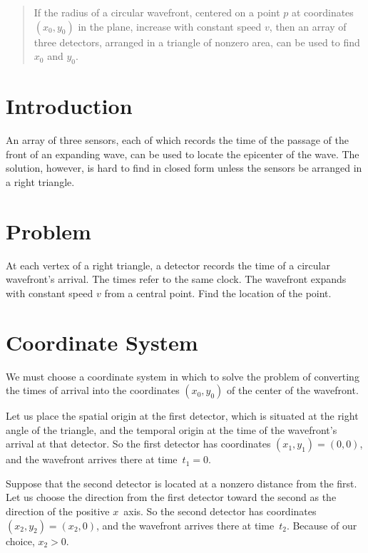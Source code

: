\documentclass[twocolumn]{article}
\begin{document}
\thispagestyle{fancy}

\begin{abstract}

   If the radius of a circular wavefront, centered on a point $p$ at
   coordinates $(x_0,y_0)$ in the plane, increase with constant speed $v$, then
   an array of three detectors, arranged in a triangle of nonzero area, can be
   used to find $x_0$ and $y_0$.

\end{abstract}

\section{Introduction}

An array of three sensors, each of which records the time of the passage of the
front of an expanding wave, can be used to locate the epicenter of the wave.
The solution, however, is hard to find in closed form unless the sensors be
arranged in a right triangle.

\section{Problem}

At each vertex of a right triangle, a detector records the time of a circular
wavefront's arrival.  The times refer to the same clock.  The wavefront expands
with constant speed $v$ from a central point.  Find the location of the point.

\section{Coordinate System}

We must choose a coordinate system in which to solve the problem of converting
the times of arrival into the coordinates $(x_0, y_0)$ of the center of the
wavefront.

Let us place the spatial origin at the first detector, which is situated at the
right angle of the triangle, and the temporal origin at the time of the
wavefront's arrival at that detector.  So the first detector has coordinates
$(x_1, y_1) = (0, 0)$, and the wavefront arrives there at time~$t_1 = 0$.

Suppose that the second detector is located at a nonzero distance from the
first.  Let us choose the direction from the first detector toward the second
as the direction of the positive $x$~axis.  So the second detector has
coordinates $(x_2, y_2) = (x_2, 0)$, and the wavefront arrives there at
time~$t_2$.  Because of our choice, $x_2 > 0$.
\end{document}
